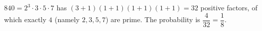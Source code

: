 $840=2^3\cdot3\cdot5\cdot7$ has $(3+1)(1+1)(1+1)(1+1)=32$ positive factors, of which exactly $4$ (namely $2,3,5,7$) are prime. The probability is $\dfrac4{32}=\boxed{\dfrac18}$.
